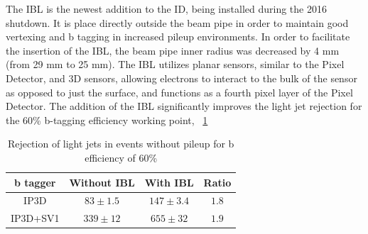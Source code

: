 \indent The IBL is the newest addition to the ID, being installed during the 2016 shutdown. It is place directly outside the beam pipe in order to maintain good vertexing and b tagging in increased pileup environments. In order to facilitate the insertion of the IBL, the beam pipe inner radius was decreased by 4 mm (from 29 mm to 25 mm). The IBL utilizes planar sensors, similar to the Pixel Detector, and 3D sensors, allowing electrons to interact to the bulk of the sensor as opposed to just the surface, and functions as a fourth pixel layer of the Pixel Detector. The addition of the IBL significantly improves the light jet rejection for the 60\% b-tagging efficiency working point,  ~\ref{tab:ibl} \linebreak

\begin{table}[t]
\centering
\begin{tabular}{cccc}\hline
b tagger & Without IBL & With IBL & Ratio\\
\hline\hline
IP3D & ${83\pm{}1.5}$ & ${147\pm{3.4}}$ & ${1.8}$\\
\hline
IP3D+SV1 & ${339\pm{}12}$ & ${655\pm{}32}$ & ${1.9}$ \\
\hline 
\end{tabular}
\caption{Rejection of light jets in \ttbar events without pileup for b efficiency of 60\%}\label{tab:ibl}
\end{table}


